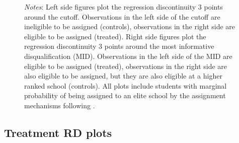 \documentclass[oneside,11pt]{article}
\begin{document}
\begin{figure}[H]
\footnotesize
\textit{Notes}: Left side figures plot the regression discontinuity 3 points around the cutoff. Observations in the left side of the cutoff are ineligible to be assigned (controls), observations in the right side are eligible to be assigned (treated). Right side figures plot the regression discontinuity 3 points around the most informative disqualification (MID). Observations in the left side of the MID are eligible to be assigned (treated), observations in the right side are also eligible to be assigned, but they are also eligible at a higher ranked school (controls). All plots include students with marginal probability of being assigned to an elite school by the assignment mechanisms following \citet{abdulkadirouglu2022breaking}. 
\end{figure}

\subsection{Treatment RD plots}
\end{document}
